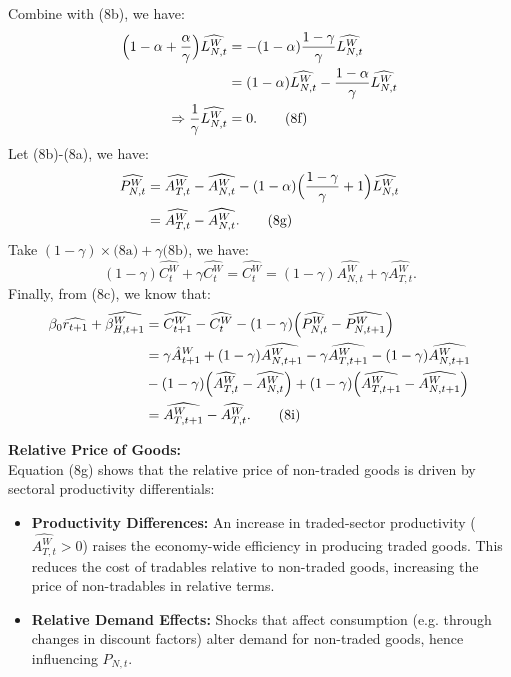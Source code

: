 \documentclass[a4paper,12pt]{article} %
\theoremstyle{nonitalic}
\begin{document}
Combine with (8b), we have:
\begin{align*}
    \Bigl(1 - \alpha + \frac{\alpha}{\gamma} \Bigr)  \widehat{L_{N,t}^W} &= -(1-\alpha) \frac{1-\gamma}{\gamma}  \widehat{L_{N,t}^W} \\
    &= (1-\alpha)  \widehat{L_{N,t}^W} - \frac{1-\alpha}{\gamma}  \widehat{L_{N,t}^W} \\
    \Rightarrow \frac{1}{\gamma}  \widehat{L_{N,t}^W} &= 0. \tag{8f}
\end{align*}
Let (8b)-(8a), we have:
\begin{align*}
     \widehat{P_{N,t}^W} &=  \widehat{A_{T,t}^W} -  \widehat{A_{N,t}^W} - (1-\alpha)\Bigl(\frac{1-\gamma}{\gamma} + 1\Bigr)  \widehat{L_{N,t}^W} \\
    &=  \widehat{A_{T,t}^W} -  \widehat{A_{N,t}^W}. \tag{8g}
\end{align*}
Take $(1-\gamma) \times \text{(8a)} + \gamma \text{(8b)}$, we have:
\[
(1-\gamma)  \widehat{C_t^W} + \gamma  \widehat{C_t^W} =  \widehat{C_t^W} = (1-\gamma)  \widehat{A_{N,t}^W} + \gamma  \widehat{A_{T,t}^W}. \tag{8h}
\]
Finally, from (8c), we know that:
\begin{align*}
    \beta_0  \widehat{r_{t+1}} + \widehat{\beta_{H, t+1}^W} &=  \widehat{C_{t+1}^W} -  \widehat{C_t^W} - (1-\gamma)\Bigl( \widehat{P_{N,t}^W} - \widehat{P_{N, t+1}^W}\Bigr) \\
    &= \gamma \hat{A}_{t+1}^W + (1-\gamma)  \widehat{A_{N,t+1}^W} - \gamma  \widehat{A_{T,t+1}^W} - (1-\gamma)  \widehat{A_{N,t+1}^W} \\
    \quad \quad &- (1-\gamma)\Bigl( \widehat{A_{T,t}^W} -  \widehat{A_{N,t}^W}\Bigr) + (1-\gamma) \Bigl( \widehat{A_{T,t+1}^W} - \widehat{A_{N, t+1}^W} \Bigr) \\
    &= \widehat{A_{T, t+1}^W} -  \widehat{A_{T,t}^W}. \tag{8i}
\end{align*}

\textbf{Relative Price of Goods:}\\
Equation (8g) shows that the relative price of non-traded goods is driven by sectoral productivity differentials:
\begin{itemize}
    \item \textbf{Productivity Differences:} An increase in traded-sector productivity ($\widehat{A_{T,t}^W} > 0$) raises the economy-wide efficiency in producing traded goods. This reduces the cost of tradables relative to non-traded goods, increasing the price of non-tradables in relative terms.
    \item \textbf{Relative Demand Effects:} Shocks that affect consumption (e.g. through changes in discount factors) alter demand for non-traded goods, hence influencing \( P_{N,t} \).
\end{itemize}
\end{document}
